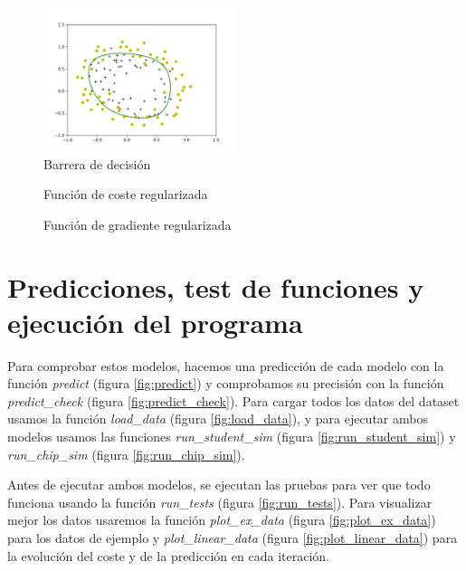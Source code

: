 \documentclass[6pt]{AiTex}
\begin{document}
\begin{figure}[H]
    \centering
    \includegraphics[width=0.5\textwidth]{./imagenes/muestreo2_sim.png}
    \caption{Barrera de decisión}
    \label{fig:decision_boundary2}
\end{figure}

\begin{figure}[H]
    \centering
    
    \caption{Función de coste regularizada}
    \label{fig:cost_reg}
\end{figure}

\begin{figure}[H]
    \centering
    
    \caption{Función de gradiente regularizada}
    \label{fig:grad_reg}
\end{figure}

\section{Predicciones, test de funciones y ejecución del programa}

Para comprobar estos modelos, hacemos una predicción de cada modelo con la función \textit{predict} (figura \ref{fig:predict}) y comprobamos su precisión con la función \textit{predict\_check} (figura \ref{fig:predict_check}). Para cargar todos los datos del dataset usamos la función \textit{load\_data} (figura \ref{fig:load_data}), y para ejecutar ambos modelos usamos las funciones \textit{run\_student\_sim} (figura \ref{fig:run_student_sim}) y \textit{run\_chip\_sim} (figura \ref{fig:run_chip_sim}).

Antes de ejecutar ambos modelos, se ejecutan las pruebas para ver que todo funciona usando la función \textit{run\_tests} (figura \ref{fig:run_tests}). Para visualizar mejor los datos usaremos la función \textit{plot\_ex\_data} (figura \ref{fig:plot_ex_data}) para los datos de ejemplo y \textit{plot\_linear\_data} (figura \ref{fig:plot_linear_data}) para la evolución del coste y de la predicción en cada iteración.
\end{document}
